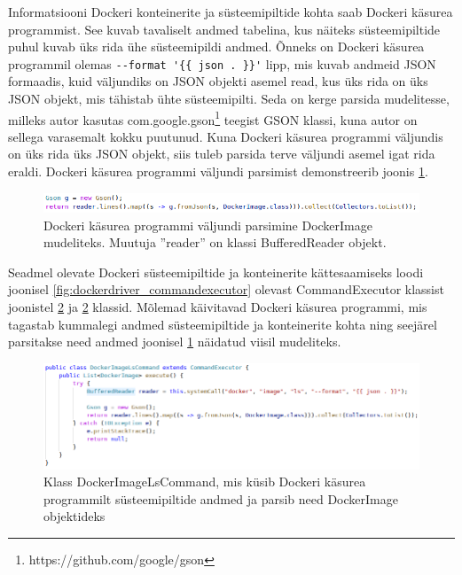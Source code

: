 \documentclass[12pt]{article}
\begin{document}
 
  Informatsiooni Dockeri konteinerite ja süsteemipiltide kohta saab Dockeri käsurea programmist.
  See kuvab tavaliselt andmed tabelina, kus näiteks süsteemipiltide puhul kuvab üks rida ühe
  süsteemipildi andmed. Õnneks on Dockeri käsurea programmil olemas
  \verb|--format '{{ json . }}'| lipp, mis kuvab andmeid JSON formaadis, kuid väljundiks
  on JSON objekti asemel read, kus üks rida on üks JSON objekt, mis tähistab ühte süsteemipilti.
  Seda on kerge parsida
  mudelitesse, milleks autor kasutas com.google.gson\footnote{https://github.com/google/gson}
  teegist GSON klassi, kuna autor on sellega varasemalt kokku puutunud. Kuna Dockeri käsurea
  programmi väljundis on üks rida üks JSON objekt, siis tuleb parsida terve väljundi asemel
  igat rida eraldi. Dockeri käsurea programmi väljundi parsimist demonstreerib joonis
  \ref{fig:dockerdriver_jsonparse}.
  
 
  \begin{figure} [ht] %
  \begin{center}
  \includegraphics[width=1.0\textwidth]{dockerdriver_jsonparse}
  \caption{Dockeri käsurea programmi väljundi parsimine DockerImage mudeliteks. Muutuja ''reader'' on klassi BufferedReader objekt.}
  \label{fig:dockerdriver_jsonparse}
  \end{center}
  \end{figure}
 
  \FloatBarrier
 
 
  Seadmel olevate Dockeri süsteemipiltide ja konteinerite kättesaamiseks loodi joonisel
  \ref{fig:dockerdriver_commandexecutor} olevast CommandExecutor klassist joonistel
  \ref{fig:dockerdriver_dockerimagelscommand} ja \ref{fig:dockerdriver_dockerimagelscommand}
  klassid. Mõlemad käivitavad Dockeri käsurea programmi, mis tagastab kummalegi andmed
  süsteemipiltide ja konteinerite kohta ning seejärel parsitakse need andmed joonisel
  \ref{fig:dockerdriver_jsonparse} näidatud viisil mudeliteks.
 
  \begin{figure} [ht] %
  \begin{center}
  \includegraphics[width=1.0\textwidth]{dockerdriver_dockerimagelscommand}
  \caption{Klass DockerImageLsCommand, mis küsib Dockeri käsurea programmilt süsteemipiltide andmed ja parsib need DockerImage objektideks}
  \label{fig:dockerdriver_dockerimagelscommand}
  \end{center}
  \end{figure}
 
\end{document}
